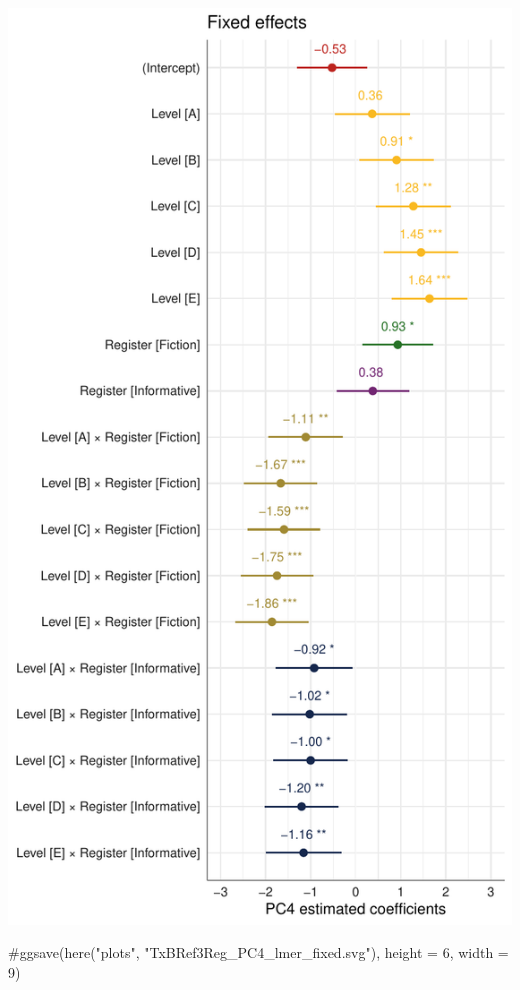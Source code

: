 \documentclass[
  letterpaper,
  DIV=11,
  numbers=noendperiod]{scrreprt}
\newenvironment{Shaded}{\begin{snugshade}}{\end{snugshade}}
\newcommand{\CommentTok}[1]{\textcolor[rgb]{0.37,0.37,0.37}{#1}}
\begin{document}
\includegraphics{AppendixH_files/figure-pdf/Dim4fixed-1.pdf}

\begin{Shaded}
\begin{Highlighting}[]
\CommentTok{\#ggsave(here("plots", "TxBRef3Reg\_PC4\_lmer\_fixed.svg"), height = 6, width = 9)}
\end{Highlighting}
\end{Shaded}
\end{document}
